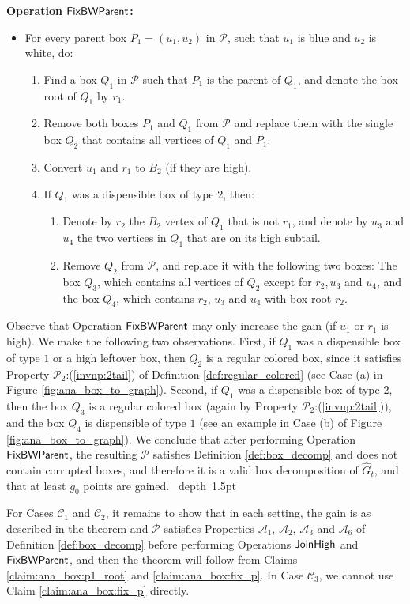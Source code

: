 \documentclass[11pt]{article}
\def\blackslug{\hbox{\hskip 1pt \vrule width 4pt height 8pt
    depth 1.5pt \hskip 1pt}}
\def\QED{\quad\blackslug\lower 8.5pt\null\par}
\def\dnsitem{\vspace{-7pt}\item}
\def\dnssubitem{\vspace{-5pt}\item}
\theoremstyle{definition}
\def\propbbr{\mathcal{P}_2}
\def\decomponereg{\mathcal{A}_1}
\def\decomponecorr{\mathcal{A}_2}
\def\decomproot{\mathcal{A}_3}
\def\decompedges{\mathcal{A}_6}
\def\boxpropnocorhigh{\mathcal{C}_1}
\def\boxpropnocorlow{\mathcal{C}_2}
\def\boxpropcor{\mathcal{C}_3}
\def\joinhigh{\mbox{\sf JoinHigh}}
\def\fixbwparent{\mbox{\sf FixBWParent}}
\begin{document}
\smallskip
\par\noindent
{\bf Operation $\fixbwparent$:}
\begin{itemize}
\dnsitem[] For every parent box $P_1 = (u_1, u_2)$ in $\mathcal{P}$, such that $u_1$ is blue and $u_2$ is white, do:
	\begin{enumerate}
		\dnsitem Find a box $Q_1$ in $\mathcal{P}$ such that $P_1$ is the parent of $Q_1$, and denote the box root of $Q_1$ by $r_1$.
		\dnsitem Remove both boxes $P_1$ and $Q_1$ from $\mathcal{P}$ and replace them with the single box $Q_2$ that contains all vertices of $Q_1$ and $P_1$.
		\dnsitem Convert $u_1$ and $r_1$ to $B_2$ (if they are high).
		\dnsitem If $Q_1$ was a dispensible box of type $2$, then:
		\begin{enumerate}
			\dnsitem Denote by $r_2$ the $B_2$ vertex of $Q_1$ that is not $r_1$, and denote by $u_3$ and $u_4$ the two vertices in $Q_1$ that are on its high subtail.
			\dnssubitem Remove $Q_2$ from $\mathcal{P}$, and replace it with the following two boxes:
			The box $Q_3$, which contains all vertices of $Q_2$ except for $r_2, u_3$ and $u_4$, 
			and the box $Q_4$, which contains $r_2$, $u_3$ and $u_4$ with box root $r_2$. 
		\end{enumerate}
	\end{enumerate}
\end{itemize}
\bigskip

Observe that Operation $\fixbwparent$ may only increase the gain (if $u_1$ or $r_1$ is high).
We make the following two observations.
First, if $Q_1$ was a dispensible box of type $1$ or a high leftover box, then $Q_2$ is a regular colored box, since it satisfies Property $\propbbr$:(\ref{invnp:2tail}) of Definition \ref{def:regular_colored}
(see Case (a) in Figure \ref{fig:ana_box_to_graph}).
Second, if $Q_1$ was a dispensible box of type $2$, then the box $Q_3$ is a regular colored box (again by Property $\propbbr$:(\ref{invnp:2tail})), and the box $Q_4$ is dispensible of type $1$ (see an example in Case (b) of Figure \ref{fig:ana_box_to_graph}).
We conclude that after performing Operation $\fixbwparent$, the resulting $\mathcal{P}$ satisfies Definition \ref{def:box_decomp} and does not contain corrupted boxes, and therefore it is a valid box decomposition of $\hat{G}_t$, and that at least $g_0$ points are gained.
\QED


For Cases $\boxpropnocorhigh$ and $\boxpropnocorlow$, it remains to show that in each setting, the gain is as described in the theorem and $\mathcal{P}$ satisfies Properties $\decomponereg$, $\decomponecorr$, $\decomproot$ and $\decompedges$ of Definition \ref{def:box_decomp} before performing Operations $\joinhigh$ and $\fixbwparent$, and then the theorem will follow from Claims \ref{claim:ana_box:p1_root} and \ref{claim:ana_box:fix_p}.
In Case $\boxpropcor$, we cannot use Claim \ref{claim:ana_box:fix_p} directly.
\end{document}

